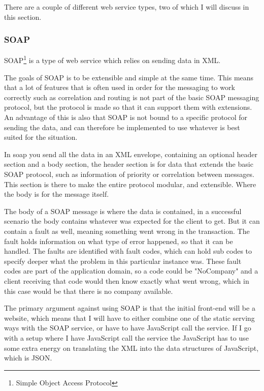 There are a couple of different web service types, two of which I will discuss
in this section. 

\subsubsection{SOAP}
\label{subs:SOAP}
SOAP\footnote{Simple Object Access Protocol} is a type of web service which
relies on sending data in XML. 

The goals of SOAP is to be extensible and simple at the same
time\cite{soap:messaging}. This means that a lot of features that is often used
in order for the messaging to work correctly such as correlation and routing is
not part of the basic SOAP messaging protocol, but the protocol is made so that
it can support them with extensions. An advantage of this is also that SOAP is
not bound to a specific protocol for sending the data, and can therefore be
implemented to use whatever is best suited for the situation. 

In soap you send all the data in an XML envelope, containing an optional header
section and a body section, the header section is for data that extends the
basic SOAP protocol, such as information of priority or correlation between
messages\cite{soap:messaging}. This section is there to make the entire protocol
modular, and extensible. Where the body is for the message itself. 

The body of a SOAP message is where the data is contained, in a successful
scenario the body contains whatever was expected for the client to get. But it
can contain a fault as well, meaning something went wrong in the transaction.
The fault holds information on what type of error happened, so that it can be
handled. The faults are identified with fault codes, which can hold sub codes to
specify deeper what the problem in this particular instance was. These fault
codes are part of the application domain, so a code could be "NoCompany" and a
client receiving that code would then know exactly what went wrong, which in
this case would be that there is no company available. 

The primary argument against using SOAP is that the initial front-end will be a
website, which means that I will have to either combine one of the static
serving ways with the SOAP service, or have to have JavaScript call the service.
If I go with a setup where I have JavaScript call the service the JavaScript has
to use some extra energy on translating the XML into the data structures of
JavaScript, which is JSON. 


